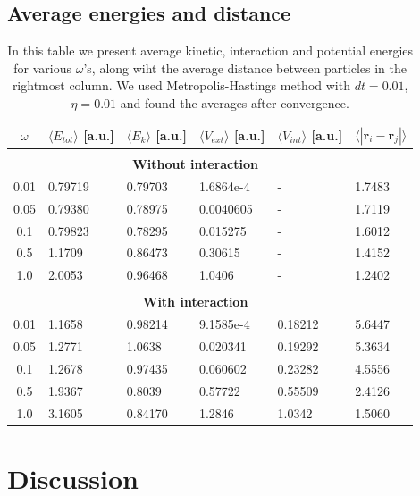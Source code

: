 \documentclass[norsk,a4paper,12pt]{article}
\begin{document}
\subsection{Average energies and distance}
\begin{table} [H]
	\caption{In this table we present average kinetic, interaction and potential energies for various $\omega$'s, along wiht the average distance between particles in the rightmost column. We used Metropolis-Hastings method with $dt=0.01$, $\eta=0.01$ and found the averages after convergence.  \vspace{2mm}}
	\begin{tabularx}{\textwidth}{c|XXXXX} \hline\hline
		\label{tab:average_energies}
		$\omega$ & $\langle E_{tot}\rangle$ [a.u.] & $\langle E_k\rangle$ [a.u.] & $\langle V_{ext}\rangle$ [a.u.] & $\langle V_{int}\rangle$ [a.u.] & $\langle |\boldsymbol{r}_i-\boldsymbol{r}_j|\rangle$ \\ \hline \\
				& \multicolumn{4}{c}{\textbf{Without interaction}}\\ \hline
				0.01 & 0.79719 & 0.79703 & 1.6864e-4 & - & 1.7483 \\
				0.05 & 0.79380 & 0.78975 & 0.0040605 & - & 1.7119 \\
				0.1 & 0.79823 & 0.78295 & 0.015275 & - & 1.6012 \\
				0.5 & 1.1709 & 0.86473 & 0.30615 & - & 1.4152 \\
				1.0 & 2.0053 & 0.96468 & 1.0406 & - & 1.2402 \\ \hline \\
		& \multicolumn{4}{c}{\textbf{With interaction}}\\ \hline
				0.01 & 1.1658 & 0.98214 & 9.1585e-4 & 0.18212 & 5.6447 \\
				0.05 & 1.2771 & 1.0638 & 0.020341 & 0.19292 & 5.3634 \\
				0.1 & 1.2678 & 0.97435 & 0.060602 & 0.23282 & 4.5556 \\
				0.5 & 1.9367 & 0.8039 & 0.57722 & 0.55509 & 2.4126 \\
				1.0 & 3.1605 & 0.84170 & 1.2846 & 1.0342 & 1.5060 \\ \hline
	\end{tabularx}
\end{table}


\section{Discussion} \label{sec:Discussion}
\end{document}
